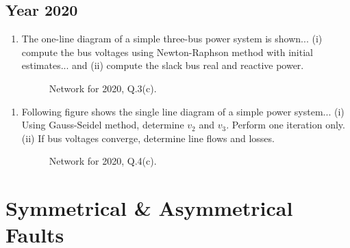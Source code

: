 \documentclass[12pt, a4paper]{article}
\begin{document}
	\subsection{Year 2020}
	\begin{enumerate}[label=\textbf{Q.3(c)}, wide, labelindent=0pt]
		\item The one-line diagram of a simple three-bus power system is shown... (i) compute the bus voltages using Newton-Raphson method with initial estimates... and (ii) compute the slack bus real and reactive power.
		\begin{figure}[h!]
			\centering
			\caption{Network for 2020, Q.3(c).}
		\end{figure}
	\end{enumerate}
	
	\begin{enumerate}[label=\textbf{Q.4(c)}, wide, labelindent=0pt]
		\item Following figure shows the single line diagram of a simple power system... (i) Using Gauss-Seidel method, determine $v_2$ and $v_3$. Perform one iteration only. (ii) If bus voltages converge, determine line flows and losses.
		\begin{figure}[h!]
			\centering
			\caption{Network for 2020, Q.4(c).}
		\end{figure}
	\end{enumerate}
	
	\section{Symmetrical \& Asymmetrical Faults}
	
\end{document}
